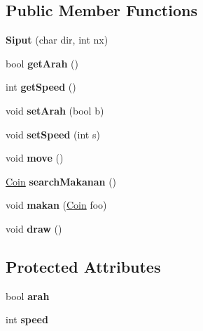 \subsection*{Public Member Functions}
\begin{DoxyCompactItemize}
\item 
\mbox{\label{class_siput_ac20b1aa07a8c41b960f5884df2bb51ef}} 
{\bfseries Siput} (char dir, int nx)
\item 
\mbox{\label{class_siput_a7f453530f1a4fe734b0293e413db65a2}} 
bool {\bfseries get\+Arah} ()
\item 
\mbox{\label{class_siput_a64e85e42b14fd786fac8ea2245d7d18c}} 
int {\bfseries get\+Speed} ()
\item 
\mbox{\label{class_siput_a199ef316f5226dffc9e01d417b3ee419}} 
void {\bfseries set\+Arah} (bool b)
\item 
\mbox{\label{class_siput_a4eb95522cd6c685459f1296bdb6b75f5}} 
void {\bfseries set\+Speed} (int s)
\item 
\mbox{\label{class_siput_a40de61cd661fe26389b4f53e071e44d4}} 
void {\bfseries move} ()
\item 
\mbox{\label{class_siput_a5610863d03fe08a35ae1d7a3a6185d4b}} 
\mbox{\hyperlink{class_coin}{Coin}} {\bfseries search\+Makanan} ()
\item 
\mbox{\label{class_siput_a9c604bc409b3067bd82b0bdbaa205086}} 
void {\bfseries makan} (\mbox{\hyperlink{class_coin}{Coin}} foo)
\item 
\mbox{\label{class_siput_ae5a33b5abcda94cd574eb38dde3c681b}} 
void {\bfseries draw} ()
\end{DoxyCompactItemize}
\subsection*{Protected Attributes}
\begin{DoxyCompactItemize}
\item 
\mbox{\label{class_siput_a21a328ffc18984b49bf2abb4f2fdfb98}} 
bool {\bfseries arah}
\item 
\mbox{\label{class_siput_a05d751125249fc623edf24faf13db0ea}} 
int {\bfseries speed}
\end{DoxyCompactItemize}
